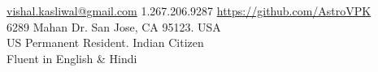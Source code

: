 \documentclass[10pt,a4paper]{article}
\begin{document}
\sloppy  %



\nobreakvspace{0.3em}  %

\noindent\href{mailto:vishal.dot.kasliwal.at.gmail.dot.com}{vishal.kasliwal\mbox{}@\mbox{}gmail.com}\sbull
\textsmaller{+}1.267.206.9287\sbull
\href{https://github.com/AstroVPK}{https://github.com/AstroVPK}
\\
6289 Mahan Dr.\sbull
San Jose, CA 95123.\sbull
USA
\\
US Permanent Resident.\sbull
Indian Citizen
\\
Fluent in English \& Hindi
\\
\spacedhrule{0.4em}{0.2em}  %

\end{document}
